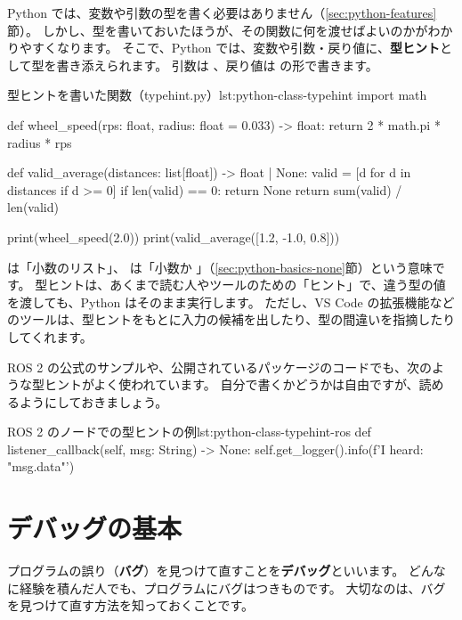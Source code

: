 Python では、変数や引数の型を書く必要はありません（\ref{sec:python-features}節）。
しかし、型を書いておいたほうが、その関数に何を渡せばよいのかがわかりやすくなります。
そこで、Python では、変数や引数・戻り値に、\textbf{型ヒント}として型を書き添えられます。
引数は 、戻り値は  の形で書きます。

\begin{codelisting}[style=python]{型ヒントを書いた関数（typehint.py）}{lst:python-class-typehint}
import math


def wheel_speed(rps: float, radius: float = 0.033) -> float:
    return 2 * math.pi * radius * rps


def valid_average(distances: list[float]) -> float | None:
    valid = [d for d in distances if d >= 0]
    if len(valid) == 0:
        return None
    return sum(valid) / len(valid)


print(wheel_speed(2.0))
print(valid_average([1.2, -1.0, 0.8]))
\end{codelisting}


 は「小数のリスト」、 は「小数か 」（\ref{sec:python-basics-none}節）という意味です。
型ヒントは、あくまで読む人やツールのための「ヒント」で、違う型の値を渡しても、Python はそのまま実行します。
ただし、VS Code の拡張機能などのツールは、型ヒントをもとに入力の候補を出したり、型の間違いを指摘したりしてくれます。

ROS 2 の公式のサンプルや、公開されているパッケージのコードでも、次のような型ヒントがよく使われています。
自分で書くかどうかは自由ですが、読めるようにしておきましょう。

\begin{codelisting}[style=python, numbers=none, xleftmargin=0pt, framexleftmargin=0pt]{ROS 2 のノードでの型ヒントの例}{lst:python-class-typehint-ros}
    def listener_callback(self, msg: String) -> None:
        self.get_logger().info(f'I heard: "{msg.data}"')
\end{codelisting}

\section{デバッグの基本}
\label{sec:python-class-debug}

プログラムの誤り（\textbf{バグ}）を見つけて直すことを\textbf{デバッグ}といいます。
どんなに経験を積んだ人でも、プログラムにバグはつきものです。
大切なのは、バグを見つけて直す方法を知っておくことです。

